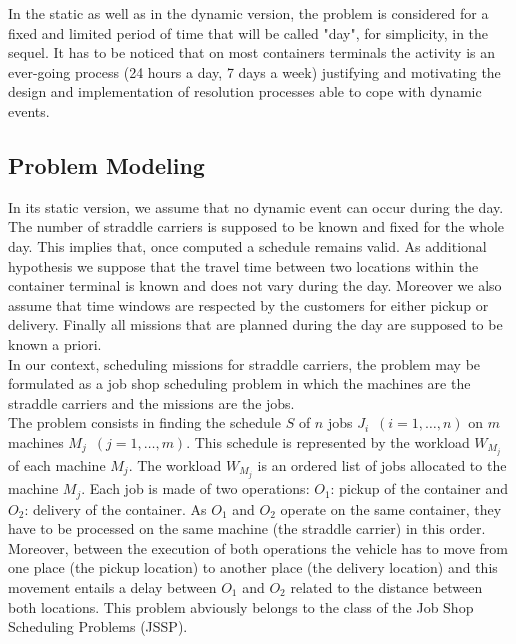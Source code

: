 \documentclass[a4paper,10pt]{article}
\begin{document}

In the static as well as in the dynamic version, the problem is considered for a fixed and limited period of time that will be called "day", for simplicity, in the sequel. It has to be noticed that on most containers terminals the activity is an ever-going process (24 hours a day, 7 days a week) justifying and motivating the design and implementation of resolution processes able to cope with dynamic events. 

\subsection{Problem Modeling}

In its static version, we assume that no dynamic event can occur during the day. The number of straddle carriers is supposed to be known and fixed for the whole day. This implies that, once computed a schedule remains valid. As additional hypothesis we suppose that the travel time between two locations within the container terminal is known and does not vary during the day. Moreover we also assume that time windows are respected by the customers for either pickup or delivery. Finally all missions that are planned during the day are supposed to be known a priori. \\


In our context, scheduling missions for straddle carriers, the problem may be formulated as a job shop scheduling problem in which the machines are the straddle carriers and the missions are the jobs. \\

The problem consists in finding the schedule $S$ of $n$ jobs $J_i$~$(i=1,\ldots,n)$ on $m$ machines $M_j$~$(j=1,\ldots,m)$. This schedule is represented by the workload $W_{M_j}$ of each machine $M_j$. The workload $W_{M_j}$ is an ordered list of jobs allocated to the machine $M_j$. Each job is made of two operations: $O_1$: pickup of the container and $O_2$: delivery of the container. As $O_1$ and $O_2$ operate on the same container, they have to be processed on the same machine (the straddle carrier) in this order. Moreover, between the execution of both operations the vehicle has to move from one place (the pickup location) to another place (the delivery location) and this movement entails a delay between $O_1$ and $O_2$ related to the distance between both locations. This problem abviously belongs to the class of the Job Shop Scheduling Problems (JSSP).
\end{document}

